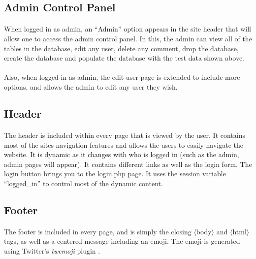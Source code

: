 \documentclass[11pt,letterpaper,titlepage]{article}
\begin{document}
        \subsection{Admin Control Panel}
        \paragraph{}
        When logged in as admin, an ``Admin'' option appears in the site header
        that will allow one to access the admin control panel. In this, the
        admin can view all of the tables in the database, edit any user, delete
        any comment, drop the database, create the database and populate the
        database with the test data shown above.

        \paragraph{}
        Also, when logged in as admin, the edit user page is extended to include
        more options, and allows the admin to edit any user they wish.


        \subsection{Header}
        \paragraph{}
        The header is included within every page that is viewed by the user. It
        contains most of the sites navigation features and allows the users to
        easily navigate the website. It is dynamic as it changes with who is
        logged in (such as the admin, admin pages will appear). It contains
        different links as well as the login form. The login button brings you
        to the login.php page. It uses the session variable ``logged\_in'' to
        control most of the dynamic content.

        \subsection{Footer}
        \paragraph{}
        The footer is included in every page, and is simply the closing
        $\langle$body$\rangle$ and $\langle$html$\rangle$ tags, as well as a
        centered message including an emoji. The emoji is generated using
        Twitter's \emph{twemoji} plugin \cite{twemoji}.
\end{document}
